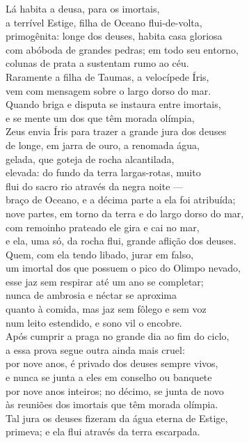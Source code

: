 \begin{pages}
\begin{Rightside}
\quad{}Lá habita a deusa,  para os imortais, \\
a terrível Estige, filha de Oceano flui-de-volta,\\
primogênita: longe dos deuses, habita casa gloriosa\\
com abóboda de grandes pedras; em todo seu entorno,\\
colunas de prata a sustentam rumo ao céu.\\
Raramente a filha de Taumas, a velocípede Íris, \\
vem com mensagem sobre o largo dorso do mar.\\
Quando briga e disputa se instaura entre imortais,\\
e se mente um dos que têm morada olímpia,\\
Zeus envia Íris para trazer a grande jura dos deuses\\
de longe, em jarra de ouro, a renomada água, \\
gelada, que goteja de rocha alcantilada,\\
elevada: do fundo da terra largas-rotas, muito\\
flui do sacro rio através da negra noite ---\\
braço de Oceano, e a décima parte a ela foi atribuída;\\
nove partes, em torno da terra e do largo dorso do mar, \\
com remoinho prateado ele gira e cai no mar,\\
e ela, uma só, da rocha flui, grande aflição dos deuses.\\
Quem, com ela tendo libado, jurar em falso,\\
um imortal dos que possuem o pico do Olimpo nevado,\\
esse jaz sem respirar até um ano se completar; \\
nunca de ambrosia e néctar se aproxima\\
quanto à comida, mas jaz sem fôlego e sem voz\\
num leito estendido, e sono vil o encobre.\\
Após cumprir a praga no grande dia ao fim do ciclo,\\
a essa prova segue outra ainda mais cruel: \\
por nove anos, é privado dos deuses sempre vivos,\\
e nunca se junta a eles em conselho ou banquete\\
por nove anos inteiros; no décimo, se junta de novo\\
às reuniões dos imortais que têm morada olímpia.\\
Tal jura os deuses fizeram da água eterna de Estige, \\
primeva; e ela flui através da terra escarpada.\\


\end{Rightside}
\end{pages}
